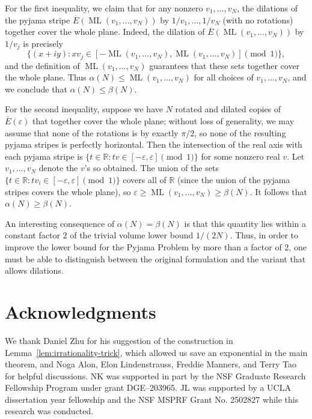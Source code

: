 \documentclass[11pt]{amsart}
\theoremstyle{definition}
\DeclareMathOperator{\ML}{ML}
\begin{document}
For the first inequality, we claim that for any nonzero $v_1, \ldots, v_N$, the dilations of the pyjama stripe $\overline{E}(\ML(v_1, \ldots, v_N))$ by $1/v_1, \ldots, 1/v_N$ (with no rotations) together cover the whole plane.  Indeed, the dilation of $\overline{E}(\ML(v_1, \ldots, v_N))$ by $1/v_j$ is precisely
    $$\{(x+iy): xv_j \in [-\ML(v_1, \ldots, v_N),\ML(v_1, \ldots, v_N)] \pmod{1}\},$$
    and the definition of $\ML(v_1, \ldots, v_N)$ guarantees that these sets together cover the whole plane.  Thus $\alpha(N) \leq \ML(v_1, \ldots, v_N)$ for all choices of $v_1, \ldots, v_N$, and we conclude that $\alpha(N) \leq \beta(N)$.

For the second inequality, suppose we have $N$ rotated and dilated copies of $\overline{E}(\varepsilon)$ that together cover the whole plane; without loss of generality, we may assume that none of the rotations is by exactly $\pi/2$, so none of the resulting pyjama stripes is perfectly horizontal.  Then the intersection of the real axis with each pyjama stripe is $\{t \in \mathbb{R}: tv \in [-\varepsilon,\varepsilon] \pmod{1}\}$ for some nonzero real $v$.  Let $v_1, \ldots, v_N$ denote the $v$'s so obtained.  The union of the sets $\{t \in \mathbb{R}: tv_i \in [-\varepsilon,\varepsilon] \pmod{1}\}$ covers all of $\mathbb{R}$ (since the union of the pyjama stripes covers the whole plane), so $\varepsilon \geq \ML(v_1, \ldots, v_N) \geq \beta(N)$.  It follows that $\alpha(N) \geq \beta(N)$.


An interesting consequence of $\alpha(N)=\beta(N)$ is that this quantity lies within a constant factor $2$ of the trivial volume lower bound $1/(2N)$.  Thus, in order to improve the lower bound for the Pyjama Problem by more than a factor of $2$, one must be able to distinguish between the original formulation and the variant that allows dilations.



\section*{Acknowledgments}
We thank Daniel Zhu for his suggestion of the construction in Lemma~\ref{lem:irrationality-trick}, which allowed us save an exponential in the main theorem, and Noga Alon, Elon Lindenstrauss, Freddie Manners, and Terry Tao for helpful discussions. NK was supported in part by the NSF Graduate Research Fellowship Program under grant DGE–203965. JL was supported by a UCLA dissertation year fellowship and the NSF MSPRF Grant No. 2502827 while this research was conducted.



\end{document}
